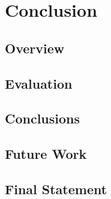 \chapter{Conclusion}
\label{ch:conclusion}
\section{Overview}
\section{Evaluation}
\section{Conclusions}
\section{Future Work}
\section{Final Statement}